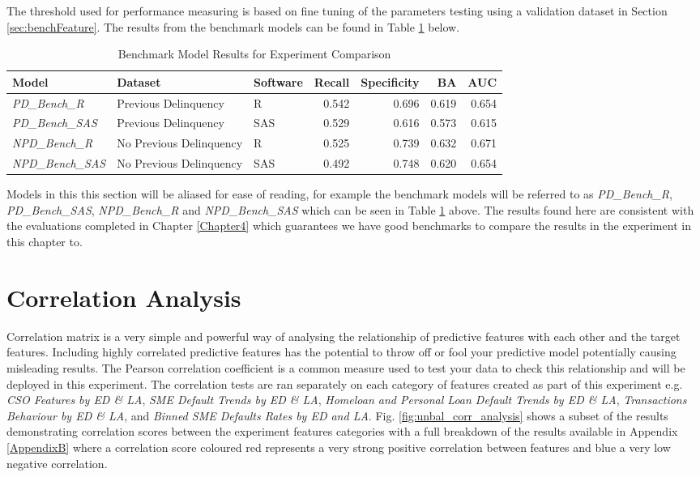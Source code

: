 The threshold used for performance measuring is based on fine tuning of the parameters testing using a validation dataset in Section \ref{sec:benchFeature}. The results from the benchmark models can be found in Table \ref{table:benchmodel} below.

\begin{table}[H]
	\centering
	\resizebox{\textwidth}{!}
	{\footnotesize
		\begin{tabular}{l l l r r r r}
			\hline
			\textbf{Model} & \textbf{Dataset} & \textbf{Software} & \textbf{Recall} & \textbf{Specificity} & \textbf{BA} & \textbf{AUC}  \\ \hline
			\textit{PD\_Bench\_R} & Previous Delinquency & R & 0.542 & 0.696 & 0.619 & 0.654   \\ 
			\textit{PD\_Bench\_SAS} & Previous Delinquency & SAS & 0.529 & 0.616 & 0.573 & 0.615   \\ \hline
			\textit{NPD\_Bench\_R} & No Previous Delinquency & R & 0.525 & 0.739 & 0.632 & 0.671   \\ 
			\textit{NPD\_Bench\_SAS} & No Previous Delinquency & SAS & 0.492 & 0.748 & 0.620 & 0.654   \\ \hline
		\end{tabular}
	}
	\caption{Benchmark Model Results for Experiment Comparison}
	\label{table:benchmodel}
\end{table}

Models in this this section will be aliased for ease of reading, for example the benchmark models will be referred to as \textit{PD\_Bench\_R}, \textit{PD\_Bench\_SAS}, \textit{NPD\_Bench\_R} and \textit{NPD\_Bench\_SAS} which can be seen in Table \ref{table:benchmodel} above. The results found here are consistent with the evaluations completed in Chapter \ref{Chapter4} which guarantees we have good benchmarks to compare the results in the experiment in this chapter to.


\section{Correlation Analysis}
Correlation matrix is a very simple and powerful way of analysing the relationship of predictive features with each other and the target features. Including highly correlated predictive features has the potential to throw off or fool your predictive model potentially causing misleading results. The Pearson correlation coefficient is a common measure used to test your data to check this relationship and will be deployed in this experiment. The correlation tests are ran separately on each category of features created as part of this experiment e.g. \textit{CSO Features by ED \& LA}, \textit{SME Default Trends by ED \& LA}, \textit{Homeloan and Personal Loan Default Trends by ED \& LA}, \textit{Transactions Behaviour by ED \& LA}, and \textit{Binned SME Defaults Rates by ED and LA}. Fig. \ref{fig:unbal_corr_analysis} shows a subset of the results demonstrating correlation scores between the experiment features categories with a full breakdown of the results available in Appendix \ref{AppendixB} where a correlation score coloured red represents a very strong positive correlation between features and blue a very low negative correlation.

